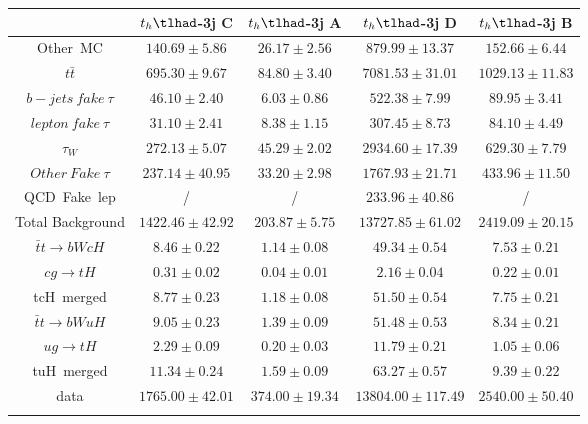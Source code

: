 \begin{tabular}{ccccc} \toprule\toprule
 & $t_{h}\tlhad$-3j C & $t_{h}\tlhad$-3j A & $t_{h}\tlhad$-3j D & $t_{h}\tlhad$-3j B\\\midrule
Other~MC & $140.69\pm5.86$ & $26.17\pm2.56$ & $879.99\pm13.37$ & $152.66\pm6.44$\\
$t\bar{t}$ & $695.30\pm9.67$ & $84.80\pm3.40$ & $7081.53\pm31.01$ & $1029.13\pm11.83$\\
$b-jets~fake~\tau$ & $46.10\pm2.40$ & $6.03\pm0.86$ & $522.38\pm7.99$ & $89.95\pm3.41$\\
$lepton~fake~\tau$ & $31.10\pm2.41$ & $8.38\pm1.15$ & $307.45\pm8.73$ & $84.10\pm4.49$\\
$\tau_{W}$ & $272.13\pm5.07$ & $45.29\pm2.02$ & $2934.60\pm17.39$ & $629.30\pm7.79$\\
$Other~Fake~\tau$ & $237.14\pm40.95$ & $33.20\pm2.98$ & $1767.93\pm21.71$ & $433.96\pm11.50$\\
QCD~Fake~lep &  / &  / & $233.96\pm40.86$ &  /\\\midrule
Total Background & $1422.46\pm42.92$ & $203.87\pm5.75$ & $13727.85\pm61.02$ & $2419.09\pm20.15$\\\midrule\midrule
$\bar{t}t\to bWcH$ & $8.46\pm0.22$ & $1.14\pm0.08$ & $49.34\pm0.54$ & $7.53\pm0.21$\\
$cg\to tH$ & $0.31\pm0.02$ & $0.04\pm0.01$ & $2.16\pm0.04$ & $0.22\pm0.01$\\
tcH~merged & $8.77\pm0.23$ & $1.18\pm0.08$ & $51.50\pm0.54$ & $7.75\pm0.21$\\\midrule
$\bar{t}t\to bWuH$ & $9.05\pm0.23$ & $1.39\pm0.09$ & $51.48\pm0.53$ & $8.34\pm0.21$\\
$ug\to tH$ & $2.29\pm0.09$ & $0.20\pm0.03$ & $11.79\pm0.21$ & $1.05\pm0.06$\\
tuH~merged & $11.34\pm0.24$ & $1.59\pm0.09$ & $63.27\pm0.57$ & $9.39\pm0.22$\\\midrule\midrule
data & $1765.00\pm42.01$ & $374.00\pm19.34$ & $13804.00\pm117.49$ & $2540.00\pm50.40$\\
\bottomrule\bottomrule\\
\end{tabular}
